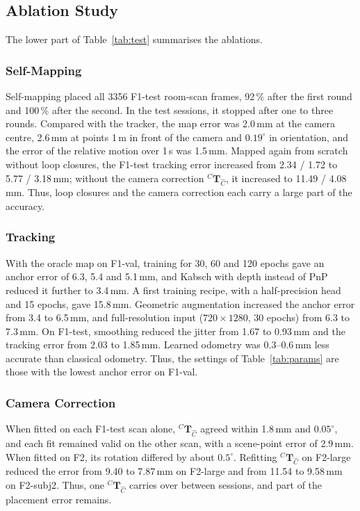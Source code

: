 \documentclass[9pt,shortpaper,twoside,web]{ieeecolor2}
\newcommand{\Tf}[2]{{}^{#1}\mathbf{T}_{#2}}
\newcommand{\Ch}{\hat{C}}%
\newcommand{\Tcorr}{\Tf{C}{\Ch}}%
\newcommand{\Fval}{F1-val}
\newcommand{\Ftest}{F1-test}
\newcommand{\Ftwo}{F2}
\newcommand{\Flarge}{F2-large}
\newcommand{\Fsubj}{F2-subj2}
\begin{document}
\subsection{Ablation Study}
\label{sec:res_ablation}\label{sec:res_mapping}\label{sec:res_tracking}\label{sec:res_calib}
The lower part of Table~\ref{tab:test} summarises the ablations.

\subsubsection{Self-Mapping} Self-mapping placed all 3356 \Ftest{} room-scan frames, 92\,\% after the first round and 100\,\% after the second. In the test sessions, it stopped after one to three rounds. Compared with the tracker, the map error was 2.0\,mm at the camera centre, 2.6\,mm at points 1\,m in front of the camera and $0.19^\circ$ in orientation, and the error of the relative motion over 1\,s was 1.5\,mm. Mapped again from scratch without loop closures, the \Ftest{} tracking error increased from 2.34 / 1.72 to 5.77 / 3.18\,mm; without the camera correction $\Tcorr$, it increased to 11.49 / 4.08\,mm. Thus, loop closures and the camera correction each carry a large part of the accuracy.

\subsubsection{Tracking} With the oracle map on \Fval{}, training for 30, 60 and 120 epochs gave an anchor error of 6.3, 5.4 and 5.1\,mm, and Kabsch with depth instead of PnP reduced it further to 3.4\,mm. A first training recipe, with a half-precision head and 15 epochs, gave 15.8\,mm. Geometric augmentation increased the anchor error from 3.4 to 6.5\,mm, and full-resolution input ($720\times1280$, 30 epochs) from 6.3 to 7.3\,mm. On \Ftest{}, smoothing reduced the jitter from 1.67 to 0.93\,mm and the tracking error from 2.03 to 1.85\,mm. Learned odometry was 0.3--0.6\,mm less accurate than classical odometry. Thus, the settings of Table~\ref{tab:params} are those with the lowest anchor error on \Fval{}.

\subsubsection{Camera Correction} When fitted on each \Ftest{} scan alone, $\Tcorr$ agreed within 1.8\,mm and $0.05^\circ$, and each fit remained valid on the other scan, with a scene-point error of 2.9\,mm. When fitted on \Ftwo{}, its rotation differed by about $0.5^\circ$. Refitting $\Tcorr$ on \Flarge{} reduced the error from 9.40 to 7.87\,mm on \Flarge{} and from 11.54 to 9.58\,mm on \Fsubj{}. Thus, one $\Tcorr$ carries over between sessions, and part of the placement error remains.
\end{document}

